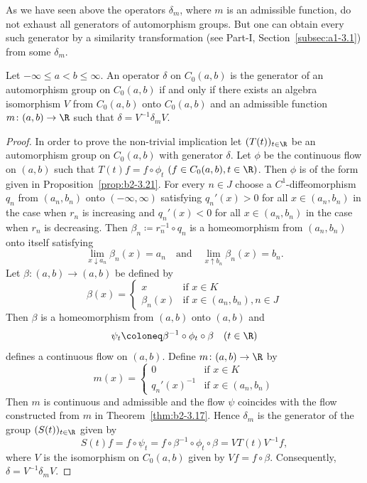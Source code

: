 As we have seen above the operators $\delta_{m}$, where $m$ is an admissible function, do not exhaust all generators of automorphism groups.
But one can obtain every such generator by a similarity transformation (see Part-I, Section~\ref{subsec:a1-3.1}) from some $\delta_{m}$.
\begin{theorem}\label{thm:b2-3.24}
%
Let $-\infty \leq a < b \leq \infty$.
An operator $\delta$ on $C_{0}(a,b)$ is the generator of an automorphism group on $C_{0}(a,b)$ if and only if there exists an algebra isomorphism $V$ from $C_{0}(a,b)$ onto $C_{0}(a,b)$ and an admissible function $m \colon (a,b) \to \R$ such that $\delta = V^{-1}\delta_{m}V$.
\end{theorem}
\begin{proof}
In order to prove the non-trivial implication let $(T(t))_{t \in \R}$ be an automorphism group on $C_{0}(a,b)$ with generator $\delta$.
Let $\phi$ be the continuous flow on $(a,b)$ such that $T(t)f = f \circ \phi_{t}$ $(f \in C_{0}(a,b), t \in \R)$.
Then $\phi$ is of the form given in Proposition~\ref{prop:b2-3.21}.
For every $n \in J$ choose a $C^{1}$-diffeomorphism $q_{n}$ from $(a_{n},b_{n})$ onto $(-\infty,\infty)$ satisfying $q_{n}'(x) > 0$ for all $x \in (a_{n},b_{n})$ in the case when $r_{n}$ is increasing and $q_{n}'(x) < 0$ for all $x \in (a_{n},b_{n})$ in the case when $r_{n}$ is decreasing.
Then $\beta_{n} \coloneq r_{n}^{-1} \circ q_{n}$ is a homeomorphism from $(a_{n},b_{n})$ onto itself satisfying 
%
\[
	\lim_{x \downarrow a_{n}}\beta_{n}(x) = a_{n} \quad \text{and} \quad 
	\lim_{x \uparrow b_{n}}\beta_{n}(x) = b_{n} . 
\]
%
Let $\beta \colon (a,b) \to (a,b)$ be defined by
\begin{equation*}\label{eq:b2-beta}
\beta(x) = \begin{cases}
    x & \text{if } x \in K \\
    \beta_{n}(x) & \text{if } x \in (a_{n},b_{n}), n \in J
\end{cases}
\end{equation*}
Then $\beta$ is a homeomorphism from $(a,b)$ onto $(a,b)$ and 
\[
	\psi_{t} \coloneq \beta^{-1} \circ \phi_{t} \circ \beta \quad (t \in \R)
\]
%
defines a continuous flow on $(a,b)$.
Define $m \colon (a,b) \to \R$ by
\begin{equation*}\label{eq:b2-m-def2}
m(x) = \begin{cases}
    0 & \text{if } x \in K \\
    q_{n}'(x)^{-1} & \text{if } x \in (a_{n},b_{n})
\end{cases}
\end{equation*}
Then $m$ is continuous and admissible and the flow $\psi$ coincides with the flow constructed from $m$ in Theorem~\ref{thm:b2-3.17}.
Hence $\delta_{m}$ is the generator of the group $(S(t))_{t \in \R}$ given by 
%
\[
	S(t)f = f \circ \psi_{t} = f \circ \beta^{-1} \circ \phi_{t} \circ \beta = VT(t)V^{-1}f ,
\]
%
where $V$ is the isomorphism on $C_{0}(a,b)$ given by $Vf = f \circ \beta$.
Consequently, $\delta = V^{-1}\delta_{m}V$.
\end{proof}
